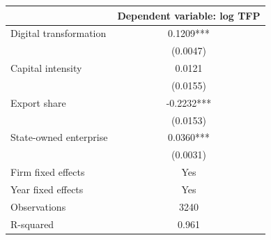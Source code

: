 \begin{tabular}{lc}
\toprule
 & Dependent variable: log TFP \\
\midrule
Digital transformation & 0.1209*** \\
 & (0.0047) \\
Capital intensity & 0.0121 \\
 & (0.0155) \\
Export share & -0.2232*** \\
 & (0.0153) \\
State-owned enterprise & 0.0360*** \\
 & (0.0031) \\
\midrule
Firm fixed effects & Yes \\
Year fixed effects & Yes \\
Observations & 3240 \\
R-squared & 0.961 \\
\bottomrule
\end{tabular}
